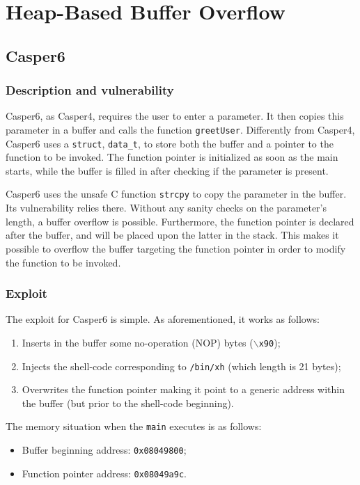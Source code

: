\section{Heap-Based Buffer Overflow}
\subsection{Casper6}
\subsubsection{Description and vulnerability}
Casper6, as Casper4, requires the user to enter a parameter. It then copies this parameter in a buffer and calls the function \texttt{greetUser}. Differently from Casper4, Casper6 uses a \texttt{struct}, \texttt{data\_t}, to store both the buffer and a pointer to the function to be invoked. The function pointer is initialized as soon as the main starts, while the buffer is filled in after checking if the parameter is present. 

Casper6 uses the unsafe C function \texttt{strcpy} to copy the parameter in the buffer. Its vulnerability relies there. Without any sanity checks on the parameter's length, a buffer overflow is possible. Furthermore, the function pointer is declared after the buffer, and will be placed upon the latter in the stack. This makes it possible to overflow the buffer targeting the function pointer in order to modify the function to be invoked.

\subsubsection{Exploit}
The exploit for Casper6 is simple. As aforementioned, it works as follows:
\begin{enumerate}
	\item Inserts in the buffer some no-operation (NOP) bytes (\texttt{$\backslash$x90});
	\item Injects the shell-code corresponding to \texttt{/bin/xh} (which length is 21 bytes);
	\item Overwrites the function pointer making it point to a generic address within the buffer (but prior to the shell-code beginning).
\end{enumerate}

The memory situation when the \texttt{main} executes is as follows:
\begin{itemize}
	\item Buffer beginning address: \texttt{0x08049800};
	\item Function pointer address: \texttt{0x08049a9c}.
\end{itemize}

